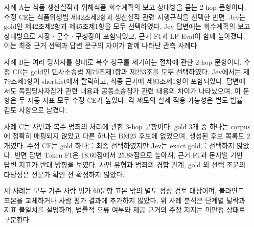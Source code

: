 사례 A는 식품 생산실적과 위해식품 회수계획의 보고 상대방을 묻는
2-hop 문항이다. 수정 CE는 식품위생법 제42조제2항과 생산실적 관련
시행규칙을 선택한 반면, Jev는 gold인 제42조제2항과 제45조제1항을
모두 선택하였다. Jev 답변에는 회수계획의 보고 상대방으로
시장ㆍ군수ㆍ구청장이 포함되었고, 근거 F1과 LF-Eval이 함께 높아졌다.
이는 최종 근거 선택과 답변 문구의 차이가 함께 나타난 관측 사례다.

사례 B는 여러 당사자를 상대로 복수 청구를 제기하는 절차에 관한
2-hop 문항이다. 수정 CE는 gold인 민사소송법 제79조제1항과
제253조를 모두 선택하였다. Jev에서는 제79조제1항이 shortlist에서
탈락하고, 최종 근거에 제83조제1항이 포함되었다.
답변에서도 독립당사자참가 관련 내용과 공동소송참가 관련 내용의
차이가 나타났으며, 이 문항은 두 자동 지표 모두 수정 CE가 높았다.
각 제도의 실제 적용 가능성은 별도 법률 검토 사항으로 남겼다.

사례 C는 사면과 복수 범죄의 처리에 관한 3-hop 문항이다.
gold 3개 중 하나는 corpus에 정확히 매핑되지 않았고 다른 하나는
BM25 후보에 없었으며, 생성된 후보 목록도 2개였다.
수정 CE는 gold 하나를 최종 선택하였지만 Jev는 exact gold를
선택하지 않았다. 반면 답변 Token F1은 18.60점에서 25.88점으로
높아져, 근거 F1과 문자열 기반 답변 지표가 반대 방향을 보였다.
사면 유형과 범죄의 경합 관계, gold 외 선택 조문의 타당성은
전문가 확인 전 확정하지 않았다.

세 사례는 모두 기존 사람 평가 60문항 표본 밖의 별도 정성 검토 대상이며,
블라인드 표본을 교체하거나 사람 평가 결과에 추가하지 않았다.
위 사례 분석은 단계별 탈락과 지표 불일치를 설명하며,
법률적 오류 여부와 제공 근거의 주장 지지는 미판정 상태로 구분한다.
